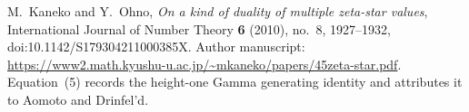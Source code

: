 M.~Kaneko and Y.~Ohno,
\emph{On a kind of duality of multiple zeta-star values},
International Journal of Number Theory \textbf{6} (2010), no.~8,
1927--1932, doi:10.1142/S179304211000385X.
Author manuscript: \url{https://www2.math.kyushu-u.ac.jp/~mkaneko/papers/45zeta-star.pdf}.
Equation~(5) records the height-one Gamma generating identity and attributes
it to Aomoto and Drinfel'd.
